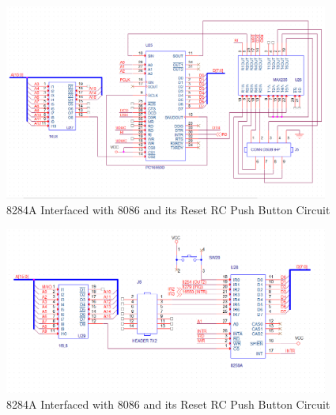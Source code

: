         \begin{figure}[ht]
            \begin{center}
                \includegraphics[width=0.95\textwidth]{figures/schematics/page8.png}
                \caption{8284A Interfaced with 8086 and its Reset RC Push Button Circuit} \label{fig:page8}
            \end{center}
        \end{figure}

        \begin{figure}[ht]
            \begin{center}
                \includegraphics[width=0.95\textwidth]{figures/schematics/page9.png}
                \caption{8284A Interfaced with 8086 and its Reset RC Push Button Circuit} \label{fig:page9}
            \end{center}
        \end{figure}




